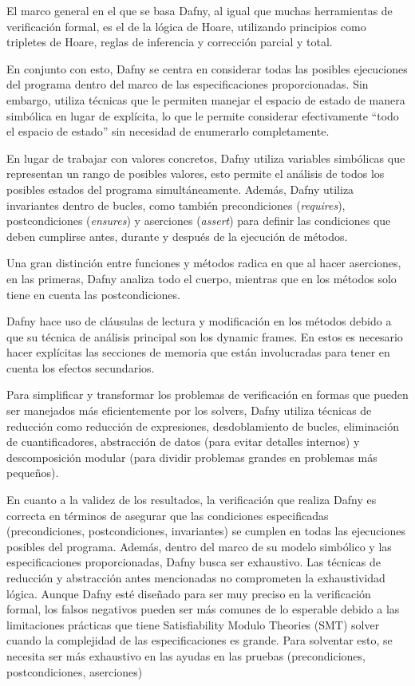 \documentclass[runningheads]{llncs}
\begin{document}
El marco general en el que se basa Dafny, al igual que muchas herramientas de verificación formal, es el de la lógica de Hoare,
utilizando principios como tripletes de Hoare, reglas de inferencia y corrección parcial y total.

En conjunto con esto, Dafny se centra en considerar todas las posibles ejecuciones del programa dentro del marco de las especificaciones proporcionadas. 
Sin embargo, utiliza técnicas que le permiten manejar el espacio de estado de manera simbólica en lugar de explícita, 
lo que le permite considerar efectivamente ``todo el espacio de estado'' sin necesidad de enumerarlo completamente.

En lugar de trabajar con valores concretos, Dafny utiliza variables simbólicas que representan un rango de posibles valores,
esto permite el análisis de todos los posibles estados del programa simultáneamente.
Además, Dafny utiliza invariantes dentro de bucles, como también precondiciones (\textit{requires}), postcondiciones (\textit{ensures}) y aserciones (\textit{assert}) para definir las condiciones 
que deben cumplirse antes, durante y después de la ejecución de métodos.

Una gran distinción entre funciones y métodos radica en que al hacer aserciones, en las primeras, Dafny analiza todo el cuerpo, mientras que en los métodos solo tiene en cuenta las postcondiciones. 

Dafny hace uso de cláusulas de lectura y modificación en los métodos debido a que su técnica de análisis principal son los dynamic frames. En estos es necesario hacer explícitas las secciones de memoria
que están involucradas para tener en cuenta los efectos secundarios.

Para simplificar y transformar los problemas de verificación en formas que pueden ser manejados más eficientemente por los solvers, 
Dafny utiliza técnicas de reducción como reducción de expresiones, desdoblamiento de bucles, eliminación de cuantificadores,
abstracción de datos (para evitar detalles internos) y descomposición modular (para dividir problemas grandes en problemas más pequeños).

En cuanto a la validez de los resultados, la verificación que realiza Dafny es correcta en términos de asegurar que las condiciones
especificadas (precondiciones, postcondiciones, invariantes) se cumplen en todas las ejecuciones posibles del programa. 
Además, dentro del marco de su modelo simbólico y las especificaciones proporcionadas,
Dafny busca ser exhaustivo. Las técnicas de reducción y abstracción antes mencionadas no comprometen la exhaustividad lógica.
Aunque Dafny esté diseñado para ser muy preciso en la verificación formal, 
los falsos negativos pueden ser más comunes de lo esperable debido a las limitaciones prácticas que tiene Satisfiability Modulo Theories (SMT) solver
cuando la complejidad de las especificaciones es grande. Para solventar esto, se necesita ser más exhaustivo en las ayudas en las pruebas (precondiciones, postcondiciones, aserciones)
\end{document}
